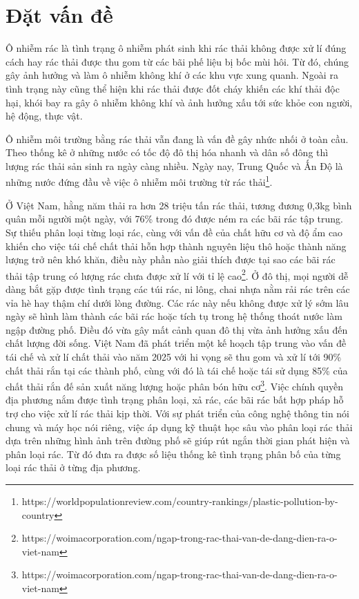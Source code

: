 \documentclass[../the.tex]{subfiles}
\begin{document}
\section{Đặt vấn đề}
\label{tong_quan}

{\fontsize{13}{12} \selectfont

Ô nhiễm rác là tình trạng ô nhiễm phát sinh khi rác thải không được xử lí đúng cách hay rác thải được thu gom từ các bãi phế liệu bị bốc mùi hôi. Từ đó, chúng gây ảnh hưởng và làm ô nhiễm không khí ở các khu vực xung quanh. Ngoài ra tình trạng này cũng thể hiện khi rác thải được đốt cháy khiến các khí thải độc hại, khói bay ra gây ô nhiễm không khí và ảnh hưởng xấu tới sức khỏe con người, hệ động, thực vật.

}

\bigskip

{\fontsize{13}{12} \selectfont

Ô nhiễm môi trường bằng rác thải vẫn đang là vấn đề gây nhức nhối ở toàn cầu. Theo thống kê ở những nước có tốc độ đô thị hóa nhanh và dân số đông thì lượng rác thải sản sinh ra ngày càng nhiều. Ngày nay, Trung Quốc và Ấn Độ là những nước đứng đầu về việc ô nhiễm môi trường từ rác thải\footnote[1]{https://worldpopulationreview.com/country-rankings/plastic-pollution-by-country}.

}

\bigskip

{\fontsize{13}{12} \selectfont

Ở Việt Nam, hằng năm thải ra hơn 28 triệu tấn rác thải, tương đương 0,3kg bình quân mỗi người một ngày, với 76\% trong đó được ném ra các bãi rác tập trung. Sự thiếu phân loại từng loại rác, cùng với vấn đề của chất hữu cơ và độ ẩm cao khiến cho việc tái chế chất thải hỗn hợp thành nguyên liệu thô hoặc thành năng lượng trở nên khó khăn, điều này phần nào giải thích được tại sao các bãi rác thải tập trung có lượng rác chưa được xử lí với tỉ lệ cao\footnote[2]{https://woimacorporation.com/ngap-trong-rac-thai-van-de-dang-dien-ra-o-viet-nam}. 
Ở đô thị, mọi người dễ dàng bắt gặp được tình trạng các túi rác, ni lông, chai nhựa nằm rải rác trên các vỉa hè hay thậm chí dưới lòng đường.
Các rác này nếu không được xử lý sớm lâu ngày sẽ hình làm thành các bãi rác hoặc tích tụ trong hệ thống thoát nước làm ngập đường phố.
Điều đó vừa gây mất cảnh quan đô thị vừa ảnh hưởng xấu đến chất lượng đời sống. 
Việt Nam đã phát triển một kế hoạch tập trung vào vấn đề tái chế và xử lí chất thải vào năm 2025 với hi vọng sẽ thu gom và xử lí tới 90\% chất thải rắn tại các thành phố, cùng với đó là tái chế hoặc tái sử dụng 85\% của chất thải rắn đế sản xuất năng lượng hoặc phân bón hữu cơ\footnote[3]{https://woimacorporation.com/ngap-trong-rac-thai-van-de-dang-dien-ra-o-viet-nam}. 
Việc chính quyền địa phương nắm được tình trạng phân loại, xả rác, các bãi rác bất hợp pháp hỗ trợ cho việc xử lí rác thải kịp thời. Với sự phát triển của công nghệ thông tin nói chung và máy học nói riêng, việc áp dụng kỹ thuật học sâu vào phân loại rác thải dựa trên những hình ảnh trên đường phố sẽ giúp rút ngắn thời gian phát hiện và phân loại rác. Từ đó đưa ra được số liệu thống kê tình trạng phân bố của từng loại rác thải ở từng địa phương.

}
\end{document}
